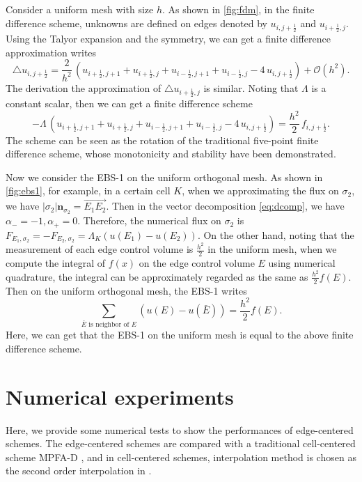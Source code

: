 \documentclass[times,review,preprint,authoryear]{elsarticle}
\newcommand{\bn}{\bm{n}}
\begin{document}
Consider a uniform mesh with size $h$. As shown in \cref{fig:fdm}, in the finite difference scheme, unknowns are defined on edges denoted by $u_{i,j+\frac12}$ and $u_{i+\frac12,j}$. Using the Talyor expansion and the symmetry, we can get a finite difference approximation writes
\begin{equation*}
\triangle u_{i,j+\frac12} = \frac{2}{h^2} \, (u_{i+\frac12,j+1} + u_{i+\frac12,j} + u_{i-\frac12,j+1} + u_{i-\frac12,j} - 4 \, u_{i,j+\frac12} ) + \mathcal{O}(h^2).
\end{equation*}
The derivation the approximation of $\triangle u_{i+\frac12,j}$ is similar. Noting that $\Lambda$ is a constant scalar, then we can get a finite difference scheme
\begin{equation}\label{eq:fdm}
-\Lambda \, (u_{i+\frac12,j+1} + u_{i+\frac12,j} + u_{i-\frac12,j+1} + u_{i-\frac12,j} - 4 \, u_{i,j+\frac12}) = \frac{h^2}{2} \, f_{i,j+\frac12}.
\end{equation}
The scheme can be seen as the rotation of the traditional five-point finite difference scheme, whose monotonicity and stability have been demonstrated.

Now we consider the EBS-1 on the uniform orthogonal mesh. As shown in \cref{fig:ebs1}, for example, in a certain cell $K$, when we approximating the flux on $\sigma_2$, we have $|\sigma_{2}| \bn_{\sigma_{2}} = \overrightarrow{E_1 E_2}$. Then in the vector decomposition \cref{eq:dcomp}, we have $\alpha_{-} = -1, \alpha_{+} = 0$. Therefore, the numerical flux on $\sigma_2$ is $F_{E_1, \sigma_2} = -F_{E_2, \sigma_2} = \Lambda_K (u(E_1) - u(E_2))$. On the other hand, noting that the measurement of each edge control volume is $\frac{h^2}{2}$ in the uniform mesh, when we compute the integral of $f(x)$ on the edge control volume $E$ using numerical quadrature, the integral can be approximately regarded as the same as $\frac{h^2}{2} f(E)$. Then on the uniform orthogonal mesh, the EBS-1 writes
\begin{equation*}
\sum_{\bar{E} \text{ is neighbor of } E} (u(E) - u(\bar{E})) = \frac{h^2}{2} f(E).
\end{equation*}
Here, we can get that the EBS-1 on the uniform mesh is equal to the above finite difference scheme.

\section{Numerical experiments}\label{sec5}

Here, we provide some numerical tests to show the performances of edge-centered schemes. The edge-centered schemes are compared with a traditional cell-centered scheme MPFA-D \cite{???}, and in cell-centered schemes, interpolation method is chosen as the second order interpolation in \cite{???}.
\end{document}
